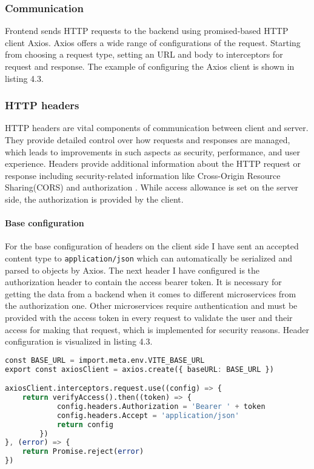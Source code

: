 \subsubsection{Communication } Frontend sends HTTP requests \cite{http-request} to the backend using promised-based HTTP client Axios. Axios offers a wide range of configurations of the request. Starting from choosing a request type, setting an URL and body to interceptors for request and response. The example of configuring the Axios client is shown in listing 4.3.

\subsubsection{HTTP headers} HTTP headers are vital components of communication between client and server. They provide detailed control over how requests and responses are managed, which leads to improvements in such aspects as security, performance, and user experience. Headers provide additional information about the HTTP request or response including security-related information like Cross-Origin Resource Sharing(CORS) \cite{http-cors} and authorization \cite{http-auth}. While access allowance is set on the server side, the authorization is provided by the client. 

\paragraph*{Base configuration} For the base configuration of headers on the client side I have sent an accepted content type to \texttt{application/json} which can automatically be serialized and parsed to objects by Axios. The next header I have configured is the authorization header to contain the access bearer token. It is necessary for getting the data from a backend when it comes to different microservices from the authorization one. Other microservices require authentication and must be provided with the access token in every request to validate the user and their access for making that request, which is implemented for security reasons. Header configuration is visualized in listing 4.3.

\begin{lstlisting}[language=Octave, caption=Base Axios configuration]
const BASE_URL = import.meta.env.VITE_BASE_URL
export const axiosClient = axios.create({ baseURL: BASE_URL })

axiosClient.interceptors.request.use((config) => {
    return verifyAccess().then((token) => {
            config.headers.Authorization = 'Bearer ' + token
            config.headers.Accept = 'application/json'
            return config
        })
}, (error) => {
    return Promise.reject(error)
})
\end{lstlisting}

